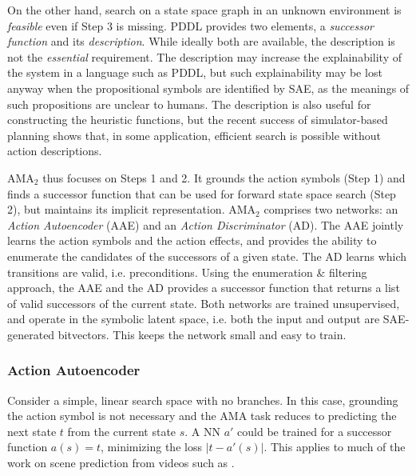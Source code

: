 \documentclass[10pt,letterpaper]{article}
\begin{document}
On the other hand, search on a state space graph in an unknown environment is \textit{feasible} even if Step 3 is missing.
PDDL provides two elements, a \emph{successor function} and its \emph{description}.
While ideally both are available, the description is not the \emph{essential} requirement.
The description may increase the explainability of the system in a language such as PDDL,
but such explainability may be lost anyway when the propositional symbols are identified by SAE, as the meanings of such propositions are unclear to humans.
The description is also useful for constructing the heuristic functions, but
the recent success of simulator-based planning \cite{frances2017purely}
shows that, in some application, efficient search is possible without action descriptions.
 
AMA$_2$ thus focuses on Steps 1 and 2.
It grounds the action symbols (Step 1) and finds a successor function that can be used for forward state space search (Step 2), but maintains its implicit representation.
% 
AMA$_2$ comprises two networks: an \emph{Action Autoencoder} (AAE) and an \emph{Action Discriminator} (AD). The AAE jointly learns the action symbols and the action effects, and provides the ability to enumerate the candidates of the successors of a given state. The AD learns which transitions are valid, i.e. preconditions. Using the enumeration \& filtering approach, the AAE and the AD provides a successor function that returns a list of valid successors of the current state. Both networks are trained unsupervised, and operate in the symbolic latent space, i.e. both the input and output are SAE-generated bitvectors. This keeps the network small and easy to train.


\subsubsection{Action Autoencoder}

Consider a simple, linear search space with no branches.
In this case, grounding the action symbol is not necessary and
the AMA task reduces to predicting the next state $t$ from the current state $s$.
A NN $a'$ could be trained for a successor function $a(s)=t$, minimizing the loss $|t-a'(s)|$.
This applies to much of the work on scene prediction from videos such as \cite{srivastava2015unsupervised}. %
\end{document}
